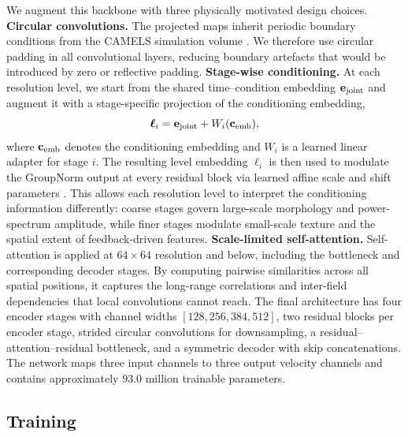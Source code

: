 \documentclass[usenatbib]{mnras}
\begin{document}
We augment this backbone with three physically motivated design
choices. \textbf{Circular convolutions.}
The projected maps inherit periodic boundary conditions from the
CAMELS simulation volume \citep{Villaescusa2022}. We therefore use
circular padding in all convolutional layers, reducing boundary
artefacts that would be introduced by zero or reflective padding.
\textbf{Stage-wise conditioning.}
At each resolution level, we start from the shared time--condition
embedding $\mathbf{e}_{\rm joint}$ and augment it with a
stage-specific projection of the conditioning embedding,
\begin{equation}
  \boldsymbol{\ell}_i
  =
  \mathbf{e}_{\rm joint} + W_i(\mathbf{c}_{\rm emb}),
  \label{eq:stage_embedding}
\end{equation}
where $\mathbf{c}_{\rm emb}$ denotes the conditioning embedding and
$W_i$ is a learned linear adapter for stage $i$. The
resulting level embedding $\boldsymbol{\ell}_i$ is then used to
modulate the GroupNorm \citep{Wu2018} output at every residual block
via learned affine scale and shift parameters \citep[FiLM;][]{Perez2018}.
This allows each resolution level to interpret the conditioning
information differently: coarse stages govern large-scale morphology
and power-spectrum amplitude, while finer stages modulate small-scale
texture and the spatial extent of feedback-driven features.
\textbf{Scale-limited self-attention.}
Self-attention \citep{Vaswani2017} is applied at $64\times64$
resolution and below, including the bottleneck and corresponding
decoder stages. By computing pairwise similarities across all spatial
positions, it captures the long-range correlations and
inter-field dependencies that local convolutions cannot reach.
The final architecture has four encoder stages with channel widths
$[128, 256, 384, 512]$, two residual blocks per encoder stage,
strided circular convolutions for downsampling, a
residual--attention--residual bottleneck, and a symmetric decoder
with skip concatenations. The network maps three input channels to
three output velocity channels and contains approximately $93.0$
million trainable parameters.

\subsection{Training}
\label{sec:training}
\end{document}

